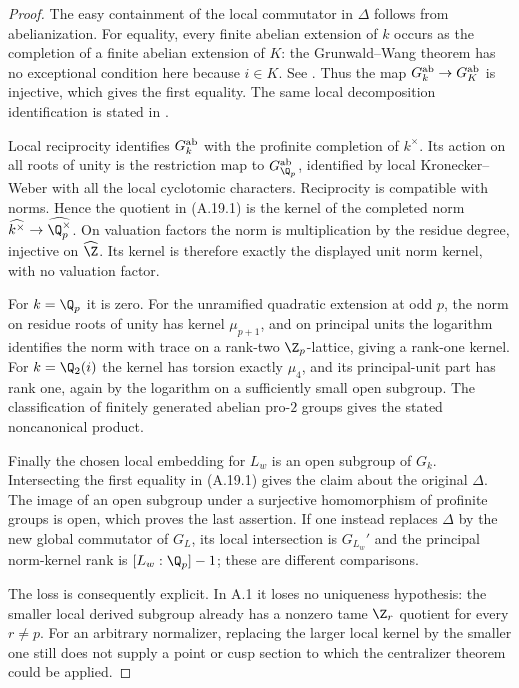 \begin{proof}
The easy containment of the local commutator in $\Delta$ follows
from abelianization. For equality, every finite abelian extension
of $k$ occurs as the completion of a finite abelian extension of
$K$: the Grunwald--Wang theorem has no exceptional condition here
because $i\in K$. See \cite[Theorems 1--2]{A_LorenzRoquette}.
Thus the map $G_k^{\rm ab}\to G_K^{\rm ab}$ is injective,
which gives the first equality. The same local decomposition
identification is stated in \cite[Chapter III, \S2.1]{A_Serre}.

Local reciprocity identifies $G_k^{\rm ab}$ with the profinite
completion of $k^{\times}$. Its action on all roots of unity
is the restriction map to $G_{\Q_p}^{\rm ab}$, identified by
local Kronecker--Weber with all the local cyclotomic characters.
Reciprocity is compatible with norms. Hence the quotient in
(A.19.1) is the kernel of the completed norm
$\widehat{k^{\times}}\to\widehat{\Q_p^{\times}}$.
On valuation factors the norm is multiplication by the residue
degree, injective on $\widehat\Z$. Its kernel is therefore
exactly the displayed unit norm kernel, with no valuation factor.

For $k=\Q_p$ it is zero. For the unramified quadratic extension
at odd $p$, the norm on residue roots of unity has kernel
$\mu_{p+1}$, and on principal units the logarithm identifies
the norm with trace on a rank-two $\Z_p$-lattice, giving a
rank-one kernel. For $k=\Q_2(i)$ the kernel has torsion
exactly $\mu_4$, and its principal-unit part has rank one,
again by the logarithm on a sufficiently small open subgroup.
The classification of finitely generated abelian pro-$2$ groups
gives the stated noncanonical product.

Finally the chosen local embedding for $L_w$ is an open subgroup
of $G_k$. Intersecting the first equality in (A.19.1) gives the
claim about the original $\Delta$. The image of an open subgroup
under a surjective homomorphism of profinite groups is open,
which proves the last assertion. If one instead replaces
$\Delta$ by the new global commutator of $G_L$, its local
intersection is $G_{L_w}'$ and the principal norm-kernel rank
is $[L_w:\Q_p]-1$; these are different comparisons.

The loss is consequently explicit. In A.1 it loses no uniqueness
hypothesis: the smaller local derived subgroup already has a
nonzero tame $\Z_r$ quotient for every $r\ne p$. For an arbitrary
normalizer, replacing the larger local kernel by the smaller one
still does not supply a point or cusp section to which the
centralizer theorem could be applied.
\end{proof}

